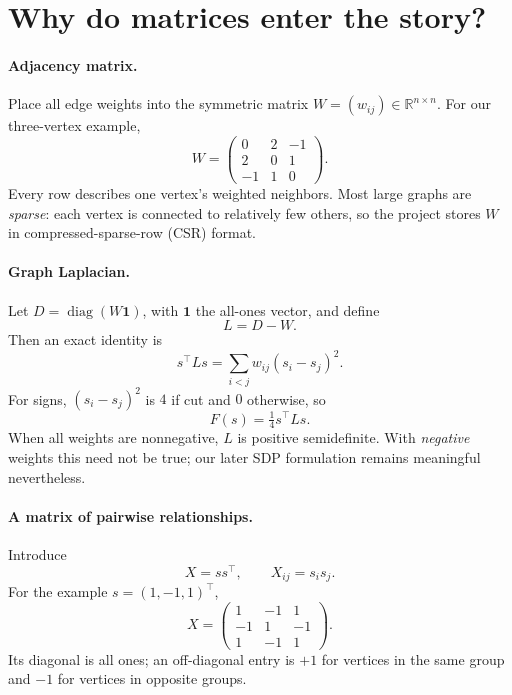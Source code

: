 \documentclass[10pt,letterpaper]{article}
\newcommand{\R}{\mathbb{R}}
\DeclareMathOperator{\diag}{diag}
\begin{document}
\section{Why do matrices enter the story?}
\label{sec:matrix}
\paragraph{Adjacency matrix.} Place all edge weights into the symmetric matrix $W=(w_{ij})\in\R^{n\times n}$. For our three-vertex example,
\begin{equation}
 W=\begin{pmatrix}0&2&-1\\2&0&1\\-1&1&0\end{pmatrix}.
\end{equation}
Every row describes one vertex's weighted neighbors. Most large graphs are \emph{sparse}: each vertex is connected to relatively few others, so the project stores $W$ in compressed-sparse-row (CSR) format.

\paragraph{Graph Laplacian.} Let $D=\diag(W\bm1)$, with $\bm1$ the all-ones vector, and define
\begin{equation}\label{eq:lap}
 L=D-W.
\end{equation}
Then an exact identity is
\begin{equation}\label{eq:lap-energy}
 s^\top Ls=\sum_{i<j}w_{ij}(s_i-s_j)^2.
\end{equation}
For signs, $(s_i-s_j)^2$ is $4$ if cut and $0$ otherwise, so
\begin{equation}\label{eq:lap-maxcut}
 \boxed{F(s)=\tfrac14 s^\top Ls.}
\end{equation}
When all weights are nonnegative, $L$ is positive semidefinite. With \emph{negative} weights this need not be true; our later SDP formulation remains meaningful nevertheless.

\paragraph{A matrix of pairwise relationships.} Introduce
\begin{equation}\label{eq:spin-gram}
 X=ss^\top,\qquad X_{ij}=s_is_j.
\end{equation}
For the example $s=(1,-1,1)^\top$,
\begin{equation}
 X=\begin{pmatrix}1&-1&1\\-1&1&-1\\1&-1&1\end{pmatrix}.
\end{equation}
Its diagonal is all ones; an off-diagonal entry is $+1$ for vertices in the same group and $-1$ for vertices in opposite groups.
\end{document}
